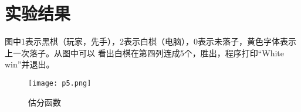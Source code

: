 \documentclass[UTF8,a4paper,12pt]{article}
\begin{document}
\pagebreak
\section{实验结果}
图中1表示黑棋（玩家，先手），2表示白棋（电脑），0表示未落子，黄色字体表示上一次落子。从图中可以
看出白棋在第四列连成5个，胜出，程序打印“White win”并退出。
\begin{figure}[h]
\begin{center}
\texttt{[image: p5.png]} %
\caption{估分函数}
\end{center}
\end{figure}
\end{document}
